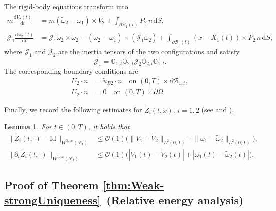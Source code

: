 \documentclass[11pt,twoside,reqno]{amsart}
\numberwithin{equation}{section}
\numberwithin{figure}{section}
\newtheorem{lemma}{Lemma}[section]
\begin{document}
The rigid-body equations transform into
\begin{equation}\label{eq:Rigidmotionconservation}
\begin{aligned}
m\frac{\mathrm{d}\tilde{V}_2(t)}{\mathrm{d}t}
&=m(\tilde{\omega}_2-\omega_1)\times\tilde{V}_2
+\int_{\partial\mathcal{B}_1(t)}P_2\,n\,\mathrm{d}S,\\
\mathcal{J}_1\frac{\mathrm{d}\tilde{\omega}_2(t)}{\mathrm{d}t}
&=\mathcal{J}_1\tilde{\omega}_2\times\tilde{\omega}_2
-(\tilde{\omega}_2-\omega_1)\times(\mathcal{J}_1\tilde{\omega}_2)
+\int_{\partial\mathcal{B}_1(t)}(x-X_1(t))\times P_2\,n\,\mathrm{d}S,
\end{aligned}
\end{equation}
where $\mathcal{J}_1$ and $\mathcal{J}_2$ are the inertia tensors of the two configurations and satisfy
\[
\mathcal{J}_1=\mathbb{O}_{1,t}\mathbb{O}_{2,t}^\top\mathcal{J}_2\mathbb{O}_{2,t}\mathbb{O}_{1,t}^\top.
\]
The corresponding boundary conditions are
\begin{equation}\label{eq:Bound}
\begin{aligned}
U_2\cdot n&=\tilde{u}_{B2}\cdot n\quad\text{on }(0,T)\times\partial\mathcal{B}_{1,t},\\
U_2\cdot n&=0\quad\text{on }(0,T)\times\partial\Omega.
\end{aligned}
\end{equation}

Finally, we record the following estimates for $\tilde{Z}_i(t,x)$, $i=1,2$ (see \cite[Lemmas~3.1–3.2]{caggio2021measure} and \cite[Corollary~1]{MR3375542}).

\begin{lemma}\label{PropertiesonTransform}
For $t\in(0,T)$, it holds that
\begin{equation}
\begin{aligned}
\|\tilde{Z}_i(t,\cdot)-\mathrm{Id}\|_{W^{3,\infty}(\mathcal{F}_t)}
&\le \mathcal{O}(1)\big(\|V_1-\tilde{V}_2\|_{L^2(0,T)}
+\|\omega_1-\tilde{\omega}_2\|_{L^2(0,T)}\big),\\
\|\partial_t\tilde{Z}_i(t,\cdot)\|_{W^{1,\infty}(\mathcal{F}_t)}
&\le \mathcal{O}(1)\big(|V_1(t)-\tilde{V}_2(t)|
+|\omega_1(t)-\tilde{\omega}_2(t)|\big).
\end{aligned}
\end{equation}
\end{lemma}





\subsection{Proof of Theorem \ref{thm:Weak-strongUniqueness} \,(Relative energy analysis)}
\end{document}
